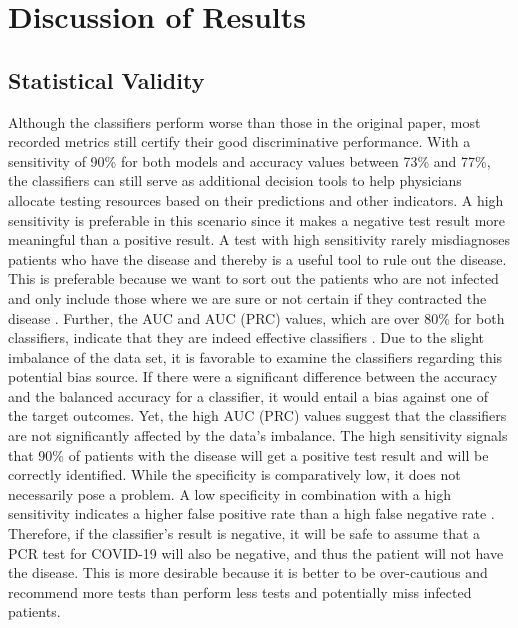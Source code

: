 \section{Discussion of Results}
\subsection{Statistical Validity}
Although the classifiers perform worse than those in the original paper, 
most recorded metrics still certify their good discriminative performance.
With a sensitivity of 90\% for both models and accuracy values between 73\% and 
77\%, the classifiers can still serve as additional decision tools to help 
physicians allocate testing resources based on their 
predictions and other indicators. 
A high sensitivity is preferable in this scenario since it makes a negative test 
result more meaningful than a positive result. A test with high sensitivity 
rarely misdiagnoses patients who have the disease and thereby is a useful tool 
to rule out the disease. This is preferable because we want to sort out the 
patients who are not infected and only include those where we are sure or not 
certain if they contracted the disease \cite{RN168}.
Further, the AUC and AUC (PRC) values, which are over 80\% 
for both classifiers, indicate that they are indeed effective classifiers 
\cite{RN167}.
Due to the slight imbalance of the data set, it is  favorable to examine the 
classifiers regarding this potential bias source. If there were a 
significant difference between the accuracy and the balanced accuracy for a 
classifier, it 
would entail a bias against one of the target outcomes. Yet, the high AUC 
(PRC) values suggest that the classifiers are not significantly affected by the 
data's imbalance.
The high sensitivity signals that 90\% of 
patients with the disease will get a positive test result and will be correctly 
identified. 
While the specificity is comparatively low, it does not necessarily pose a 
problem. A low specificity in combination with a high sensitivity indicates a 
higher false positive rate than a high false negative rate \cite{RN168}.
Therefore, if the classifier's result is negative, it will be safe to 
assume that a PCR test for COVID-19 will also be negative, and thus the patient 
will not have the disease.
This is more desirable because it is better to be over-cautious and recommend 
more tests than perform less tests and potentially miss infected patients.
